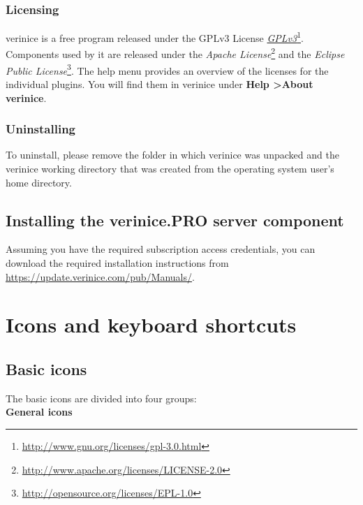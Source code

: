 \documentclass[a4paper,10pt]{book}
\begin{document}
\subsection{Licensing}
verinice is a free program released under the GPLv3 License
\href{http://www.gnu.org/licenses/gpl-3.0.txt}{\em GPLv3}\footnote{\url{http://www.gnu.org/licenses/gpl-3.0.html}}.
Components used by it are released under the {\em Apache License}\footnote{\url{http://www.apache.org/licenses/LICENSE-2.0}}
and the {\em Eclipse Public License}\footnote{\url{http://opensource.org/licenses/EPL-1.0}}.
The help menu provides an overview of the licenses for the individual plugins. You will find them in verinice under
\textbf{Help \textgreater About verinice}.

\subsection{Uninstalling}
To uninstall, please remove the folder in which verinice was unpacked and the verinice working directory
that was created from the operating system user's home directory.

\section{Installing the verinice.PRO server component}
Assuming you have the required subscription access credentials, you
can download the required installation instructions from
\url{https://update.verinice.com/pub/Manuals/}.

\chapter{Icons and keyboard shortcuts}
\section{Basic icons}
The basic icons are divided into four groups:
\newline\\
\textbf{General icons}
\end{document}
